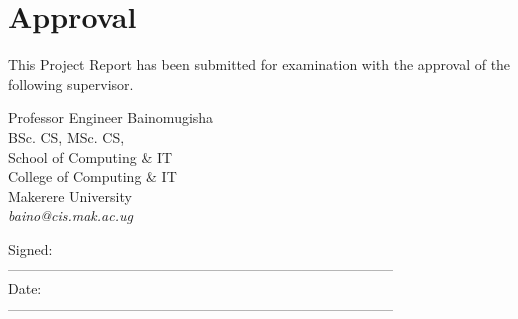 \chapter*{Approval}
This Project Report has been submitted for examination with the approval of the following supervisor.

\vspace{2.0em}

\noindent
Professor Engineer Bainomugisha \\
BSc. CS, MSc. CS,\\
School of Computing \& IT\\
College of Computing \& IT\\
Makerere University\\
\emph{baino@cis.mak.ac.ug}

\vspace{1.0em}
\noindent
Signed:\\
\tab-----------------------------------------------------------------------------------\\
Date:\\
\tab-----------------------------------------------------------------------------------\\

\newpage